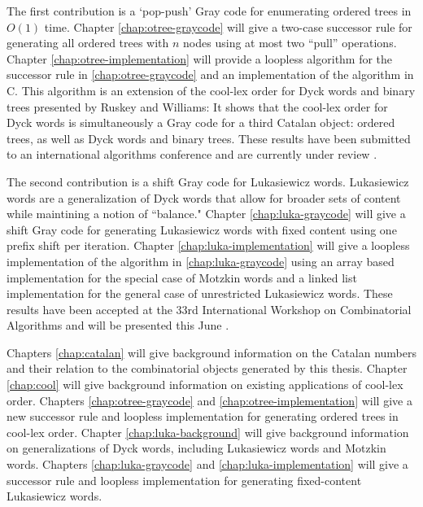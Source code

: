 The first contribution is a `pop-push' Gray code for enumerating ordered trees in $O(1)$ time. Chapter \ref{chap:otree-graycode} will give a two-case successor rule for generating all ordered trees with $n$ nodes using at most two ``pull'' operations. Chapter \ref{chap:otree-implementation} will provide a loopless algorithm for the successor rule in \ref{chap:otree-graycode} and an implementation of the algorithm in C.  This algorithm is an extension of the cool-lex order for Dyck words and binary trees presented by Ruskey and Williams: It shows that the cool-lex order for Dyck words is simultaneously a Gray code for a third Catalan object: ordered trees, as well as Dyck words and binary trees.  These results have been submitted to an international algorithms conference and are currently under review \cite{lapeypush}.

The second contribution is a shift Gray code for Lukasiewicz words.  Lukasiewicz words are a generalization of Dyck words that allow for broader sets of content while maintining a notion of ``balance." Chapter \ref{chap:luka-graycode} will give a shift Gray code for generating Lukasiewicz words with fixed content using one prefix shift per iteration.  Chapter \ref{chap:luka-implementation} will give a loopless implementation of the algorithm in \ref{chap:luka-graycode} using an array based implementation for the special case of Motzkin words and a linked list implementation for the general case of unrestricted Lukasiewicz words.  These results have been accepted at the 33rd International Workshop on Combinatorial Algorithms and will be presented this June \cite{lapey2022shift}.

Chapters \ref{chap:catalan} will give background information on the Catalan numbers and their relation to the combinatorial objects generated by this thesis.  Chapter \ref{chap:cool} will give background information on existing applications of cool-lex order.  Chapters \ref{chap:otree-graycode} and \ref{chap:otree-implementation} will give a new successor rule and loopless implementation for generating ordered trees in cool-lex order.  Chapter \ref{chap:luka-background} will give background information on generalizations of Dyck words, including Lukasiewicz words and Motzkin words. Chapters \ref{chap:luka-graycode} and \ref{chap:luka-implementation} will give a successor rule and loopless implementation for generating fixed-content Lukasiewicz words.
